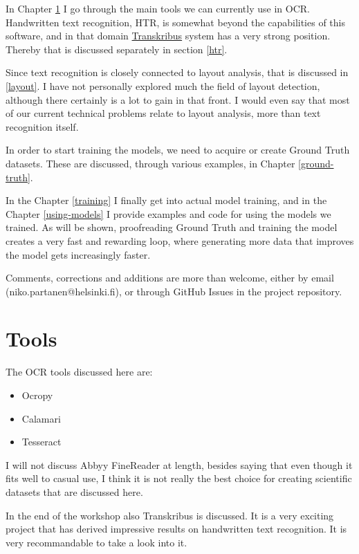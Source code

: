 \documentclass[]{book}
\providecommand{\tightlist}{%
  \setlength{\itemsep}{0pt}\setlength{\parskip}{0pt}}
\begin{document}
In Chapter \ref{tools} I go through the main tools we can currently use in OCR. Handwritten text recognition, HTR, is somewhat beyond the capabilities of this software, and in that domain \href{https://transkribus.eu/Transkribus/}{Transkribus} system has a very strong position. Thereby that is discussed separately in section \ref{htr}.

Since text recognition is closely connected to layout analysis, that is discussed in \ref{layout}. I have not personally explored much the field of layout detection, although there certainly is a lot to gain in that front. I would even say that most of our current technical problems relate to layout analysis, more than text recognition itself.

In order to start training the models, we need to acquire or create Ground Truth datasets. These are discussed, through various examples, in Chapter \ref{ground-truth}.

In the Chapter \ref{training} I finally get into actual model training, and in the Chapter \ref{using-models} I provide examples and code for using the models we trained. As will be shown, proofreading Ground Truth and training the model creates a very fast and rewarding loop, where generating more data that improves the model gets increasingly faster.

Comments, corrections and additions are more than welcome, either by email (niko.partanen@helsinki.fi), or through GitHub Issues in the project repository.

\hypertarget{tools}{%
\chapter{Tools}\label{tools}}

The OCR tools discussed here are:

\begin{itemize}
\tightlist
\item
  Ocropy
\item
  Calamari
\item
  Tesseract
\end{itemize}

I will not discuss Abbyy FineReader at length, besides saying that even though it fits well to casual use, I think it is not really the best choice for creating scientific datasets that are discussed here.

In the end of the workshop also Transkribus is discussed. It is a very exciting project that has derived impressive results on handwritten text recognition. It is very recommandable to take a look into it.
\end{document}
